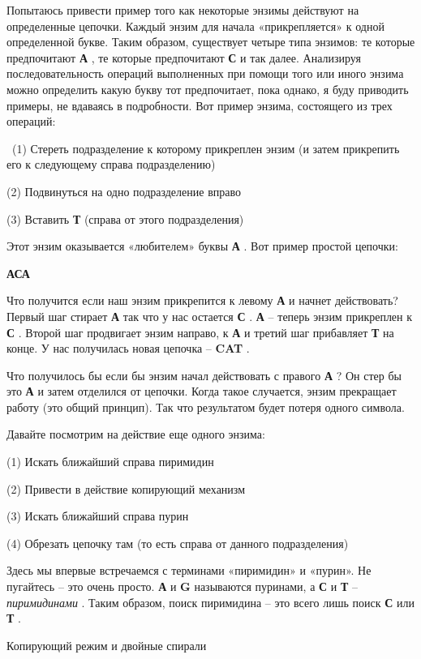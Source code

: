 \documentclass[../main.tex]{subfiles}
\begin{document}
Попытаюсь привести пример того как некоторые энзимы действуют на определенные цепочки. Каждый энзим для начала «прикрепляется» к одной определенной букве. Таким образом, существует четыре типа энзимов: те которые предпочитают \textbf{А} , те которые предпочитают \textbf{С} и так далее. Анализируя последовательность операций выполненных при помощи того или иного энзима можно определить какую букву тот предпочитает, пока однако, я буду приводить примеры, не вдаваясь в подробности. Вот пример энзима, состоящего из трех операций:

~(1) Стереть подразделение к которому прикреплен энзим (и затем прикрепить его к следующему справа подразделению)

(2) Подвинуться на одно подразделение вправо

(3) Вставить \textbf{Т} (справа от этого подразделения)

Этот энзим оказывается «любителем» буквы \textbf{А} . Вот пример простой цепочки:

\textbf{АСА}

Что получится если наш энзим прикрепится к левому \textbf{А} и начнет действовать? Первый шаг стирает \textbf{А} так что у нас остается \textbf{С} . \textbf{А} \--- теперь энзим прикреплен к \textbf{С} . Второй шаг продвигает энзим направо, к \textbf{А} и третий шаг прибавляет \textbf{Т} на конце. У нас получилась новая цепочка \--- \textbf{CAT} .

Что получилось бы если бы энзим начал действовать с правого \textbf{А} ? Он стер бы это \textbf{А} и затем отделился от цепочки. Когда такое случается, энзим прекращает работу (это общий принцип). Так что результатом будет потеря одного символа.

Давайте посмотрим на действие еще одного энзима:

(1) Искать ближайший справа пиримидин

(2) Привести в действие копирующий механизм

(3) Искать ближайший справа пурин

(4) Обрезать цепочку там (то есть справа от данного подразделения)

Здесь мы впервые встречаемся с терминами «пиримидин» и «пурин». Не пугайтесь \--- это очень просто. \textbf{А} и \textbf{G} называются пуринами, а \textbf{С} и \textbf{Т} \--- \emph{пиримидинами} . Таким образом, поиск пиримидина \--- это всего лишь поиск \textbf{С} или \textbf{Т} .

Копирующий режим и двойные спирали
\end{document}
